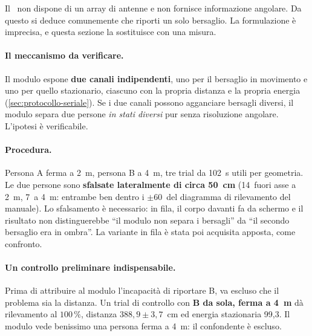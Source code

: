 Il \ldb\ non dispone di un array di antenne e non fornisce informazione angolare. Da
questo si deduce comunemente che riporti un solo bersaglio. La formulazione è
imprecisa, e questa sezione la sostituisce con una misura.

\paragraph{Il meccanismo da verificare.} Il modulo espone \textbf{due canali
indipendenti}, uno per il bersaglio in movimento e uno per quello stazionario, ciascuno
con la propria distanza e la propria energia (\cref{sec:protocollo-seriale}). Se i due
canali possono agganciare bersagli diversi, il modulo separa due persone \emph{in
stati diversi} pur senza risoluzione angolare. L'ipotesi è verificabile.

\paragraph{Procedura.} Persona A ferma a 2~m, persona B a 4~m, tre trial da 102~s utili
per geometria. Le due persone sono \textbf{sfalsate lateralmente di circa 50~cm}
(14\textdegree\ fuori asse a 2~m, 7\textdegree\ a 4~m: entrambe ben dentro i
$\pm 60$\textdegree\ del diagramma di rilevamento del manuale). Lo sfalsamento è
necessario: in fila, il corpo davanti fa da schermo e il risultato non distinguerebbe
``il modulo non separa i bersagli'' da ``il secondo bersaglio era in ombra''. La
variante in fila è stata poi acquisita apposta, come confronto.

\paragraph{Un controllo preliminare indispensabile.} Prima di attribuire al modulo
l'incapacità di riportare B, va escluso che il problema sia la distanza. Un trial di
controllo con \textbf{B da sola, ferma a 4~m} dà rilevamento al $100\,\%$, distanza
$388{,}9 \pm 3{,}7$~cm ed energia stazionaria 99,3. Il modulo vede benissimo una
persona ferma a 4~m: il confondente è escluso.

